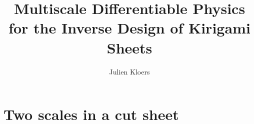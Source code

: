 \documentclass[aspectratio=169,11pt]{beamer}
\title{Multiscale Differentiable Physics for the Inverse Design of Kirigami Sheets}
\author{Julien Kloers}
\newcommand{\platelabel}[1]{\\[0.9mm]{\scriptsize\color{chartergrey}#1}}
\begin{document}
\chartertitlepage


\section{Two scales in a cut sheet}
\sectionslide{}

%
%
\end{document}
